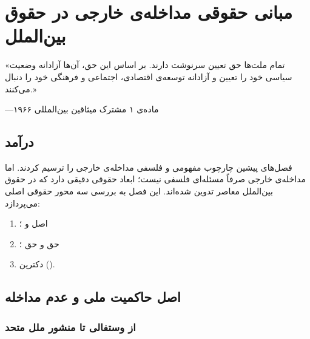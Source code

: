 
\chapter{مبانی حقوقی مداخله‌ی خارجی در حقوق بین‌الملل}
\label{ch:legal}

\begin{tcolorbox}[quotebox, title={}]
	«تمام ملت‌ها حق تعیین سرنوشت دارند. بر اساس این حق، آن‌ها
	آزادانه وضعیت سیاسی خود را تعیین و آزادانه توسعه‌ی اقتصادی،
	اجتماعی و فرهنگی خود را دنبال می‌کنند.»
	
	\hfill ---ماده‌ی ۱ مشترک میثاقین بین‌المللی
	۱۹۶۶
\end{tcolorbox}


\section{درآمد}
\label{sec:ch03-intro}

فصل‌های پیشین چارچوب مفهومی و فلسفی مداخله‌ی خارجی را ترسیم
کردند. اما مداخله‌ی خارجی صرفاً مسئله‌ای فلسفی نیست؛ ابعاد
حقوقی دقیقی دارد که در حقوق بین‌الملل معاصر تدوین شده‌اند.
این فصل به بررسی سه محور حقوقی اصلی می‌پردازد:
\begin{enumerate}[label=\textbf{\arabic*.}, nosep, rightmargin=1em]
	\item اصل  و ؛
	\item حق  و حق ؛
	\item دکترین  ().
\end{enumerate}


\section{اصل حاکمیت ملی و عدم مداخله}
\label{sec:ch03-sovereignty}

\subsection{از وستفالی تا منشور ملل متحد}
\label{subsec:ch03-westphalia}

